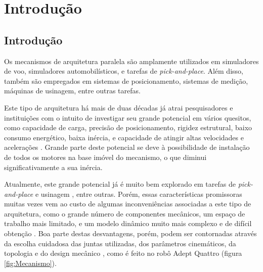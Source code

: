 \documentclass[]{politex}
\begin{document}
\sumario




\part{Introdução}
	
\chapter{Introdução}

Os mecanismos de arquitetura paralela são amplamente utilizados em simuladores de voo, simuladores automobilísticos, e tarefas de {\em pick-and-place}. Além disso, também são empregados em sistemas de posicionamento, sistemas de medição, máquinas de usinagem, entre outras tarefas. 

Este tipo de arquitetura há mais de duas décadas já atrai pesquisadores e instituições com o intuito de investigar seu grande potencial em vários quesitos, como capacidade de carga, precisão de posicionamento, rigidez estrutural, baixo consumo energético, baixa inércia, e capacidade de atingir altas velocidades e acelerações \cite{Cheng, Khalil, Merlet2002, Pashkevich, Tsai}. Grande parte deste potencial se deve à possibilidade de instalação de todos os motores na base imóvel do mecanismo, o que diminui significativamente a sua inércia. 

Atualmente, este grande potencial já é muito bem explorado em tarefas de {\em pick-and-place} \cite{Clavel} e usinagem \cite{Pashkevich}, entre outras. Porém, essas características promissoras muitas vezes vem ao custo de algumas inconveniências associadas a este tipo de arquitetura, como o grande número de componentes mecânicos, um espaço de trabalho mais limitado, e um modelo dinâmico muito mais complexo e de difícil obtenção \cite{Rynaldo, Merlet2002}. Boa parte destas desvantagens, porém, podem ser contornadas através da escolha cuidadosa das juntas utilizadas, dos parâmetros cinemáticos, da topologia e do design mecânico \cite{Briot, Campos, Jiang, Zhan}, como é feito no robô Adept Quattro (figura \ref{fig:Mecanismo}).
\end{document}

